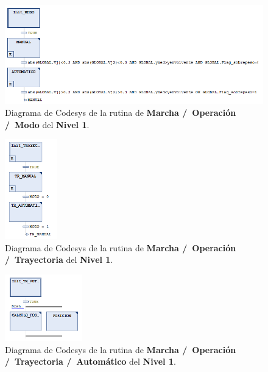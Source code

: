 \documentclass[11pt]{article}
\begin{document}
\begin{figure}
	\centering
	\includegraphics[width=1\textwidth]{images/codesys_nivel_1_marcha_operacion_modo.png}
	\caption{Diagrama de Codesys de la rutina de \textbf{Marcha /\ Operación /\ Modo} del \textbf{Nivel 1}.}
	\label{fig:codesys_nivel_1_marcha_operacion_modo}
\end{figure}

\begin{figure}
	\centering
	\includegraphics[width=0.2\textwidth]{images/codesys_nivel_1_marcha_operacion_trayectoria.png}
	\caption{Diagrama de Codesys de la rutina de \textbf{Marcha /\ Operación /\ Trayectoria} del \textbf{Nivel 1}.}
	\label{fig:codesys_nivel_1_marcha_operacion_trayectoria}
\end{figure}

\begin{figure}
	\centering
	\includegraphics[width=0.3\textwidth]{images/codesys_nivel_1_marcha_operacion_trayectoria_automatico.png}
	\caption{Diagrama de Codesys de la rutina de \textbf{Marcha /\ Operación /\ Trayectoria /\ Automático} del \textbf{Nivel 1}.}
	\label{fig:codesys_nivel_1_marcha_operacion_trayectoria_automatico}
\end{figure}
\end{document}
